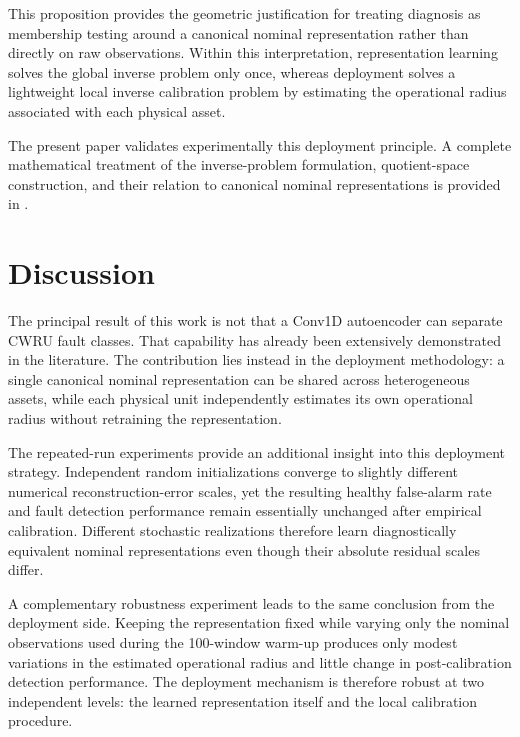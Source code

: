 \documentclass[11pt,a4paper]{article}
\begin{document}
This proposition provides the geometric justification for treating diagnosis as membership
testing around a canonical nominal representation rather than directly on raw observations.
Within this interpretation, representation learning solves the global inverse problem only
once, whereas deployment solves a lightweight local inverse calibration problem by estimating
the operational radius associated with each physical asset.

The present paper validates experimentally this deployment principle. A complete mathematical
treatment of the inverse-problem formulation, quotient-space construction, and their relation
to canonical nominal representations is provided in
\cite{disanti2026inverse,disanti2026quotient}.

\section{Discussion}
\label{sec:discussion}

The principal result of this work is not that a Conv1D autoencoder can separate CWRU fault
classes. That capability has already been extensively demonstrated in the literature. The
contribution lies instead in the deployment methodology: a single canonical nominal
representation can be shared across heterogeneous assets, while each physical unit
independently estimates its own operational radius without retraining the representation.

The repeated-run experiments provide an additional insight into this deployment strategy.
Independent random initializations converge to slightly different numerical reconstruction-error
scales, yet the resulting healthy false-alarm rate and fault detection performance remain
essentially unchanged after empirical calibration. Different stochastic realizations therefore
learn diagnostically equivalent nominal representations even though their absolute residual
scales differ.

A complementary robustness experiment leads to the same conclusion from the deployment side.
Keeping the representation fixed while varying only the nominal observations used during the
100-window warm-up produces only modest variations in the estimated operational radius and
little change in post-calibration detection performance. The deployment mechanism is therefore
robust at two independent levels: the learned representation itself and the local calibration
procedure.
\end{document}
